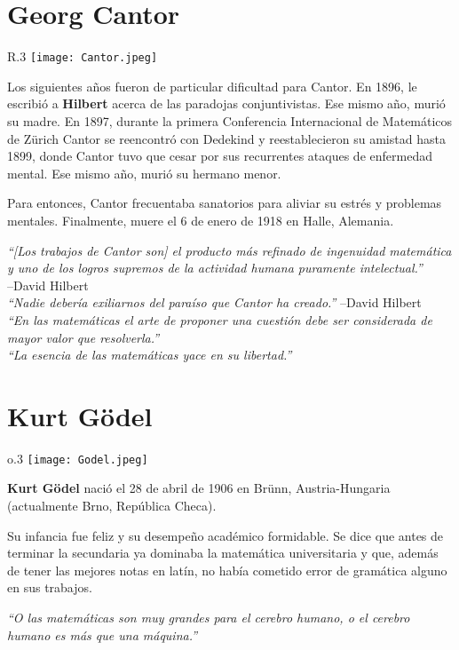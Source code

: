 \documentclass[11pt,a4paper]{book}
\begin{document}
\section{Georg Cantor}
\begin{wrapfigure}{R}{.3\textwidth}
	\centering
	\texttt{[image: Cantor.jpeg]}
	\caption{}
\end{wrapfigure}
Los siguientes años fueron de particular dificultad para Cantor. En 1896, le escribió a \textbf{Hilbert} acerca de las paradojas conjuntivistas. Ese mismo año, murió su madre. En 1897, durante la primera Conferencia Internacional de Matemáticos de Zürich Cantor se reencontró con Dedekind y reestablecieron su amistad hasta 1899, donde Cantor tuvo que cesar por sus recurrentes ataques de enfermedad mental. Ese mismo año, murió su hermano menor.

Para entonces, Cantor frecuentaba sanatorios para aliviar su estrés y problemas mentales. Finalmente, muere el 6 de enero de 1918 en Halle, Alemania.

\begin{flushright}
\textit{``[Los trabajos de Cantor son] el producto más refinado de ingenuidad matemática y uno de los logros supremos de la actividad humana puramente intelectual.''}\\
--David Hilbert\\[\baselineskip]
\textit{``Nadie debería exiliarnos del paraíso que Cantor ha creado.''}
--David Hilbert\\[\baselineskip]
\textit{``En las matemáticas el arte de proponer una cuestión debe ser considerada de mayor valor que resolverla.''}\\[\baselineskip]
\textit{``La esencia de las matemáticas yace en su libertad.''}
\end{flushright}

\section{Kurt Gödel}
\begin{wrapfigure}{o}{.3\textwidth}
	\centering
	\texttt{[image: Godel.jpeg]}
	\caption{}
\end{wrapfigure}
\textbf{Kurt Gödel} nació el 28 de abril de 1906 en Brünn, Austria-Hungaria (actualmente Brno, República Checa).

Su infancia fue feliz y su desempeño académico formidable. Se dice que antes de terminar la secundaria ya dominaba la matemática universitaria y que, además de tener las mejores notas en latín, no había cometido error de gramática alguno en sus trabajos.

\begin{flushright}
\itshape
``O las matemáticas son muy grandes para el cerebro humano, o el cerebro humano es más que una máquina.''
\end{flushright}

\printindex
\printnomenclature

\nocite{*}
\printbibliography[heading=bibintoc]
\end{document}
